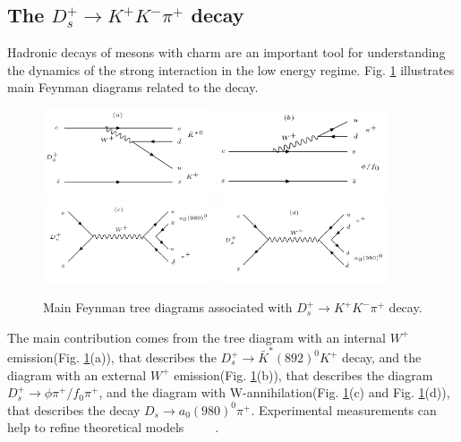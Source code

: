 \subsection{The $D_{s}^{+} \rightarrow K^{+}K^{-}\pi^{+}$ decay}
\par{
    Hadronic decays of mesons with charm are an important tool for understanding the dynamics of the strong interaction in the low energy regime.
    Fig. \ref{Feynman-dia} illustrates main Feynman diagrams related to the decay.
    \begin{figure}[h]
        \centering
        \includegraphics[width=0.45\textwidth]{plot/Fa.PNG}
        \includegraphics[width=0.45\textwidth]{plot/Fb.PNG}
        \includegraphics[width=0.45\textwidth]{plot/Fc.PNG}
        \includegraphics[width=0.45\textwidth]{plot/Fd.PNG}
        \caption{Main Feynman tree diagrams associated with $D_{s}^{+} \rightarrow K^{+}K^{-}\pi^{+}$ decay.}
        \label{Feynman-dia}
    \end{figure}
    The main contribution comes from the tree diagram with an internal $W^{+}$ emission(Fig. \ref{Feynman-dia}(a)), that describes the $D_{s}^{+} \rightarrow \bar{K}^{*}(892)^{0}K^{+}$ decay, 
    and the diagram with an external $W^{+}$ emission(Fig. \ref{Feynman-dia}(b)), that describes the diagram $D_{s}^{+} \rightarrow \phi\pi^{+}/ f_{0}\pi^{+}$, 
    and the diagram with W-annihilation(Fig. \ref{Feynman-dia}(c) and Fig. \ref{Feynman-dia}(d)), that describes the decay $D_{s} \rightarrow a_{0}(980)^{0}\pi^{+}$.
    Experimental measurements can help to refine theoretical models ~\cite{PRD67-094007} ~\cite{PRD81-074031} ~\cite{PLB707-116}.
}
    
